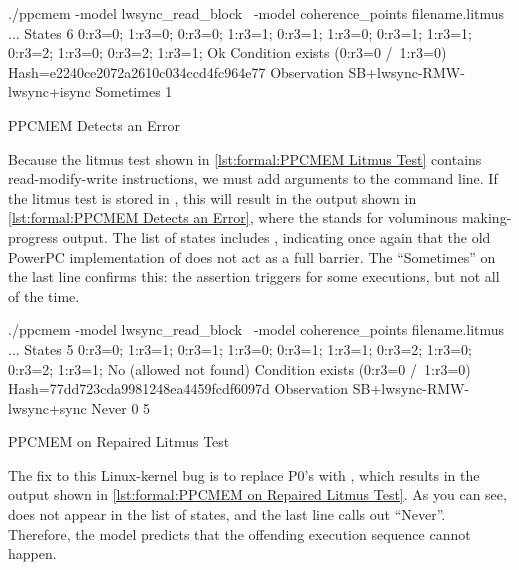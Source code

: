 \begin{listing}
\begin{VerbatimL}[numbers=none,xleftmargin=0pt]
./ppcmem -model lwsync_read_block \
         -model coherence_points filename.litmus
...
States 6
0:r3=0; 1:r3=0;
0:r3=0; 1:r3=1;
0:r3=1; 1:r3=0;
0:r3=1; 1:r3=1;
0:r3=2; 1:r3=0;
0:r3=2; 1:r3=1;
Ok
Condition exists (0:r3=0 /\ 1:r3=0)
Hash=e2240ce2072a2610c034ccd4fc964e77
Observation SB+lwsync-RMW-lwsync+isync Sometimes 1
\end{VerbatimL}
\caption{PPCMEM Detects an Error}
\label{lst:formal:PPCMEM Detects an Error}
\end{listing}

Because the litmus test shown in
\cref{lst:formal:PPCMEM Litmus Test}
contains read-modify-write instructions, we must add 
arguments to the command line.
If the litmus test is stored in ,
this will result in the output shown in
\cref{lst:formal:PPCMEM Detects an Error},
where the  stands for voluminous making-progress output.
The list of states includes \co{0:r3=0; 1:r3=0;}, indicating once again
that the old PowerPC implementation of \co{atomic_add_return()} does
not act as a full barrier.
The ``Sometimes'' on the last line confirms this: the assertion triggers
for some executions, but not all of the time.

\begin{listing}
\begin{VerbatimL}[numbers=none,xleftmargin=0pt]
./ppcmem -model lwsync_read_block \
         -model coherence_points filename.litmus
...
States 5
0:r3=0; 1:r3=1;
0:r3=1; 1:r3=0;
0:r3=1; 1:r3=1;
0:r3=2; 1:r3=0;
0:r3=2; 1:r3=1;
No (allowed not found)
Condition exists (0:r3=0 /\ 1:r3=0)
Hash=77dd723cda9981248ea4459fcdf6097d
Observation SB+lwsync-RMW-lwsync+sync Never 0 5
\end{VerbatimL}
\caption{PPCMEM on Repaired Litmus Test}
\label{lst:formal:PPCMEM on Repaired Litmus Test}
\end{listing}

The fix to this Linux-kernel bug is to replace P0's  with
, which results in the output shown in
\cref{lst:formal:PPCMEM on Repaired Litmus Test}.
As you can see, \co{0:r3=0; 1:r3=0;} does not appear in the list of states,
and the last line calls out ``Never''.
Therefore, the model predicts that the offending execution sequence
cannot happen.

